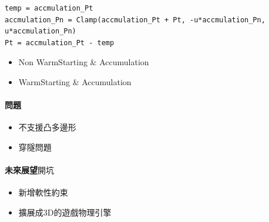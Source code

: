 \begin{lstlisting} 
temp = accmulation_Pt
accmulation_Pn = Clamp(accmulation_Pt + Pt, -u*accmulation_Pn, u*accmulation_Pn)
Pt = accmulation_Pt - temp
\end{lstlisting}

\begin{itemize}
    \item{Non \- WarmStarting \& Accumulation}
    \item{WarmStarting \& Accumulation}
\end{itemize}


\paragraph{問題}

\begin{itemize}
    \item{不支援凸多邊形}
    \item{穿隧問題}
\end{itemize}

\paragraph{未來展望\(開坑\)}
\begin{itemize}
    \item{新增軟性約束}
    \item{擴展成3D的遊戲物理引擎}
\end{itemize}
\newpage